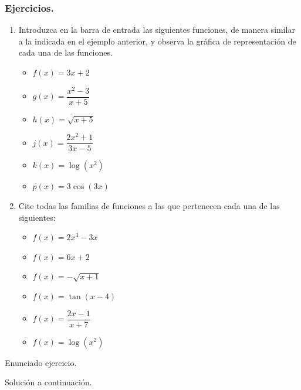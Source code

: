 \subsubsection{Ejercicios.}
\begin{enumerate}
	\item Introduzca en la barra de entrada las siguientes funciones, de manera similar a la indicada en el ejemplo anterior, y observa la gráfica de representación de cada una de las funciones.\\
	\begin{itemize}
		\item $f(x) = 3x+2$
		\item $g(x) = \dfrac{x^2-3}{x+5}$
		\item $h(x) = \sqrt{x+5}$
		\item $j(x) = \dfrac{2x^2+1}{3x-5}$
		\item $k(x) = \log (x^2)$
		\item $p(x) = 3\cos(3x)$
	\end{itemize}
	\item Cite todas las familias de funciones a las que pertenecen cada una de las siguientes:
	\begin{itemize}
		\item $f(x) = 2x^3-3x$
		\item $f(x) = 6x+2$
		\item $f(x) = -\sqrt{x+1}$
		\item $f(x) = \tan (x-4)$
		\item $f(x) = \dfrac{2x-1}{x+7}$
		\item $f(x) = \log(x^2)$
	\end{itemize}

\end{enumerate}

\begin{ex}
	Enunciado ejercicio.
	\lipsum[1]
	\begin{sol}
		Solución a continuación.
		\lipsum[1]
	\end{sol}
\end{ex}
